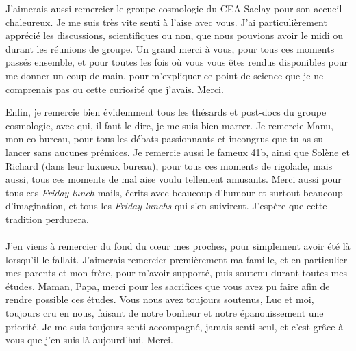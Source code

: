J'aimerais aussi remercier le groupe cosmologie du CEA Saclay pour son accueil chaleureux. Je me suis très vite senti à l'aise avec vous. J'ai particulièrement apprécié les discussions, scientifiques ou non, que nous pouvions avoir le midi ou durant les réunions de groupe. Un grand merci à vous, pour tous ces moments passés ensemble, et pour toutes les fois où vous vous êtes rendus disponibles pour me donner un coup de main, pour m'expliquer ce point de science que je ne comprenais pas ou cette curiosité que j'avais. Merci.

Enfin, je remercie bien évidemment tous les thésards et post-docs du groupe cosmologie, avec qui, il faut le dire, je me suis bien marrer. Je remercie Manu, mon co-bureau, pour tous les débats passionnants et incongrus que tu as su lancer sans aucunes prémices. Je remercie aussi le fameux 41b, ainsi que Solène et Richard (dans leur luxueux bureau), pour tous ces moments de rigolade, mais aussi, tous ces moments de mal aise voulu tellement amusants. Merci aussi pour tous ces \emph{Friday lunch} mails, écrits avec beaucoup d'humour et surtout beaucoup d'imagination, et tous les \emph{Friday lunchs} qui s'en suivirent. J'espère que cette tradition perdurera.

\paragraph{}
J'en viens à remercier du fond du cœur mes proches, pour simplement avoir été là lorsqu'il le fallait.
J'aimerais remercier premièrement ma famille, et en particulier mes parents et mon frère, pour m'avoir supporté, puis soutenu durant toutes mes études. Maman, Papa, merci pour les sacrifices que vous avez pu faire afin de rendre possible ces études. Vous nous avez toujours soutenus, Luc et moi, toujours cru en nous, faisant de notre bonheur et notre épanouissement une priorité. Je me suis toujours senti accompagné, jamais senti seul, et c'est grâce à vous que j'en suis là aujourd'hui. Merci.

